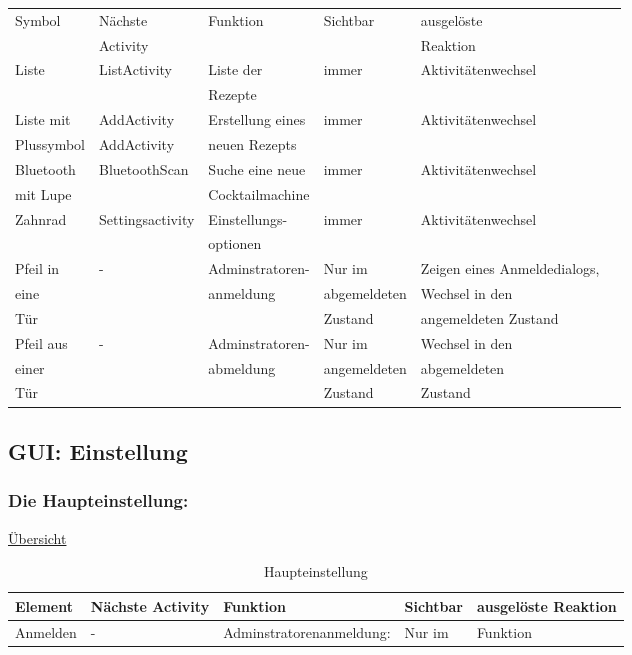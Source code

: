 {\begin{table}
	\begin{tabular}{|l|l|l|l|l|l|}
		\hline
		Symbol  & Nächste   & Funktion  & Sichtbar  & ausgelöste  \\
		&  Activity  &   &   &  Reaktion \\ \hline
		Liste  & ListActivity  & Liste der    & immer  & Aktivitätenwechsel \\ 
		&    &   Rezepte  &    &   \\ \hline
		Liste mit   & AddActivity  & Erstellung eines  & immer  & Aktivitätenwechsel \\ 
		Plussymbol  & AddActivity  &  neuen Rezepts  &   &  \\ \hline
		Bluetooth   & BluetoothScan  & Suche eine neue   & immer  & Aktivitätenwechsel \\
		mit Lupe  &   &  Cocktailmachine  &    &   \\ \hline
		Zahnrad  & Settingsactivity  & Einstellungs-  & immer  & Aktivitätenwechsel \\   &    & optionen   &    &   \\ \hline
		Pfeil in   & -  & Adminstratoren-  & Nur im   & Zeigen eines Anmeldedialogs, \\
		eine   &  &anmeldung   & abgemeldeten   & Wechsel in den  \\ 
		Tür   &  &    &  Zustand  & angemeldeten Zustand \\ \hline
		Pfeil aus   & -  & Adminstratoren-  & Nur im  & Wechsel in den \\  
		einer   &   &abmeldung    &  angemeldeten   & abgemeldeten  \\
		Tür  &   &    &   Zustand  &  Zustand \\ \hline
	\end{tabular}
	
\end{table}


\subsection{GUI: Einstellung}

\subsubsection{Die Haupteinstellung:}

\hyperref[table:main]{Übersicht}
\begin{table}
	\centering
	\caption{Haupteinstellung}
	\label{table:main}
	\begin{tabular}{|l|l|l|l|l|}
		\hline
		\textbf{Element } & \textbf{Nächste Activity } & \textbf{Funktion } & \textbf{Sichtbar } & \textbf{ausgelöste Reaktion} \\ \hline
		Anmelden  & -  & Adminstratorenanmeldung:   & Nur im   & Funktion \\
		

\end{tabular}
\end{table}}
